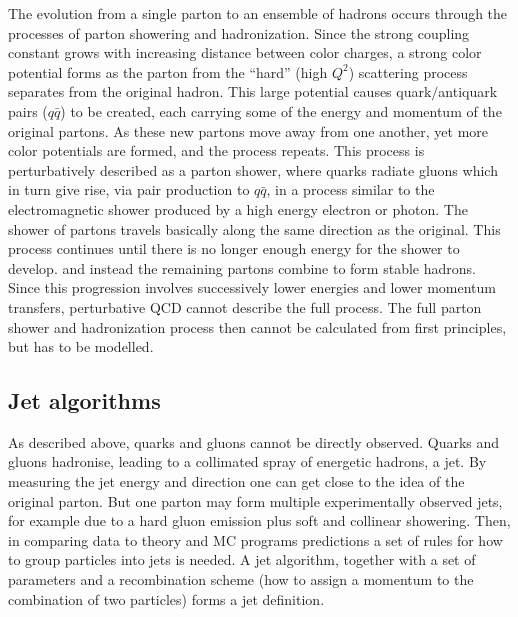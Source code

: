 The evolution from a single parton to an ensemble of hadrons occurs through the processes of parton showering and hadronization. Since the strong coupling constant grows with increasing distance between color charges, a strong color potential forms as the parton from the ``hard'' (high $Q^2$) scattering process separates from the original hadron. 
This large potential causes quark$/$antiquark pairs ($q\bar{q}$) to be created, each carrying some of the energy and momentum of the original partons. As these new partons move away from one another, yet more color potentials are formed, and the process repeats. This process is perturbatively described as a parton shower, where quarks radiate gluons which in turn give rise, via pair production to $q\bar{q}$, in a process similar to the electromagnetic shower produced by a high energy electron or photon.
 The shower of partons travels basically along the same direction as the original.  This process continues until there is no longer enough energy  %
for the shower to develop.
and instead the remaining partons combine to form stable hadrons. Since this progression involves successively lower energies and lower momentum transfers, perturbative QCD cannot describe the full process.  The full parton shower and hadronization process then cannot be calculated from first principles, but has to be modelled.



\subsection{Jet algorithms}\label{sec:jetalgos}


As described above, quarks and gluons cannot be directly observed. %
Quarks and gluons hadronise, leading to a collimated spray of energetic hadrons, a jet. By measuring the jet energy and direction one can get close to the idea of the original parton. But one parton may form multiple experimentally observed jets, for example due to a hard gluon emission plus soft and collinear showering. Then, in comparing data to theory and MC programs predictions a set of rules for how to group particles into jets is needed. A jet algorithm, together with a set of parameters and a recombination scheme (how to assign a momentum to the combination of two particles) forms a jet definition.

